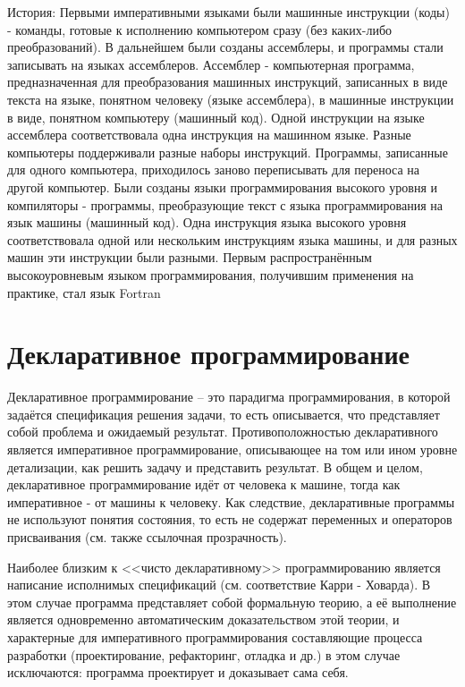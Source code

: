 \documentclass[12pt, twoside]{report}
\begin{document}
История:
Первыми императивными языками были машинные инструкции (коды) - команды, готовые к исполнению компьютером сразу (без каких-либо преобразований). В дальнейшем были созданы ассемблеры, и программы стали записывать на языках ассемблеров. Ассемблер - компьютерная программа, предназначенная для преобразования машинных инструкций, записанных в виде текста на языке, понятном человеку (языке ассемблера), в машинные инструкции в виде, понятном компьютеру (машинный код). Одной инструкции на языке ассемблера соответствовала одна инструкция на машинном языке. Разные компьютеры поддерживали разные наборы инструкций. Программы, записанные для одного компьютера, приходилось заново переписывать для переноса на другой компьютер. Были созданы языки программирования высокого уровня и компиляторы - программы, преобразующие текст с языка программирования на язык машины (машинный код). Одна инструкция языка высокого уровня соответствовала одной или нескольким инструкциям языка машины, и для разных машин эти инструкции были разными. Первым распространённым высокоуровневым языком программирования, получившим применения на практике, стал язык Fortran

\section*{Декларативное программирование}

Декларативное программирование -- это парадигма программирования, в которой задаётся спецификация решения задачи, то есть описывается, что представляет собой проблема и ожидаемый результат. Противоположностью декларативного является императивное программирование, описывающее на том или ином уровне детализации, как решить задачу и представить результат. В общем и целом, декларативное программирование идёт от человека к машине, тогда как императивное - от машины к человеку. Как следствие, декларативные программы не используют понятия состояния, то есть не содержат переменных и операторов присваивания (см. также ссылочная прозрачность).

Наиболее близким к <<чисто декларативному>> программированию является написание исполнимых спецификаций (см. соответствие Карри - Ховарда). В этом случае программа представляет собой формальную теорию, а её выполнение является одновременно автоматическим доказательством этой теории, и характерные для императивного программирования составляющие процесса разработки (проектирование, рефакторинг, отладка и др.) в этом случае исключаются: программа проектирует и доказывает сама себя.
\end{document}
